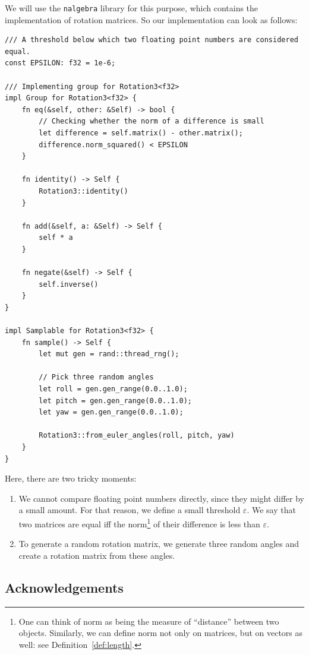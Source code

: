 \documentclass[../../book.tex]{subfiles}
\begin{document}
We will use the \texttt{nalgebra} library for this purpose, which contains the implementation of rotation matrices. 
So our implementation can look as follows:
\begin{verbatim}
/// A threshold below which two floating point numbers are considered equal.
const EPSILON: f32 = 1e-6;

/// Implementing group for Rotation3<f32>
impl Group for Rotation3<f32> {
    fn eq(&self, other: &Self) -> bool {
        // Checking whether the norm of a difference is small
        let difference = self.matrix() - other.matrix();
        difference.norm_squared() < EPSILON
    }

    fn identity() -> Self {
        Rotation3::identity()
    }

    fn add(&self, a: &Self) -> Self {
        self * a
    }

    fn negate(&self) -> Self {
        self.inverse()
    }
}

impl Samplable for Rotation3<f32> {
    fn sample() -> Self {
        let mut gen = rand::thread_rng();

        // Pick three random angles
        let roll = gen.gen_range(0.0..1.0);
        let pitch = gen.gen_range(0.0..1.0);
        let yaw = gen.gen_range(0.0..1.0);

        Rotation3::from_euler_angles(roll, pitch, yaw)
    }
}
\end{verbatim}

\vspace{-2mm}

Here, there are two tricky moments:
\begin{enumerate}
    \item We cannot compare floating point numbers directly, since they might differ by a small amount. For that reason, we define a small threshold $\varepsilon$. We say that two matrices are equal iff the norm\footnote{One can think of norm as being the measure of ``distance'' between two objects. Similarly, we can define norm not only on matrices, but on vectors as well: see Definition~\ref{def:length}.} of their difference is less than $\varepsilon$.
    \item To generate a random rotation matrix, we generate three random angles and create a rotation matrix from these angles.
\end{enumerate}

\subsection*{Acknowledgements}
\end{document}
